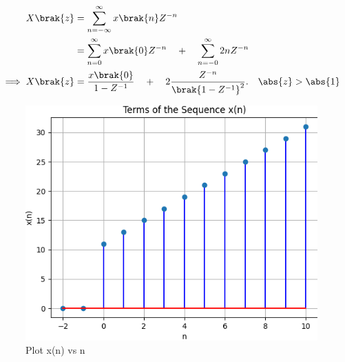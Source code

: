 \documentclass[journal,12pt,twocolumn]{IEEEtran}
\theoremstyle{remark}
\begin{document}
\begin{align}
X\brak{z}&= \sum_{n=-\infty}^{\infty} x\brak{n}Z^{-n} \\
&=\sum_{n=0}^{\infty} x\brak{0}Z^{-n}\quad +\quad \sum_{n=-0}^{\infty}2nZ^{-n}\\
\implies X\brak{z}&=\frac{x\brak{0}}{1-Z^{-1}}\quad+\quad 2\frac{Z^{-n}}{\brak{1-Z^{-1}}^{2}}.\quad \abs{z} > \abs{1}
\end{align}

\newpage

\begin{figure}
    \includegraphics[width=\columnwidth]{figs/fig.png}
    \centering
    Plot x(n) vs n
    \label{fig:enter-label}
\end{figure}
\end{document}
